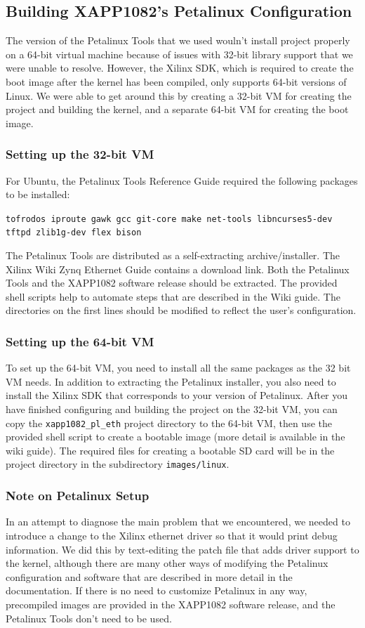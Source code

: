 \documentclass[12pt]{report}
\begin{document}
\subsection{Building XAPP1082's Petalinux Configuration}
The version of the Petalinux Tools that we used wouln't install project properly on a 64-bit virtual machine because of issues with 32-bit library support that we were unable to resolve. However, the Xilinx SDK, which is required to create the boot image after the kernel has been compiled, only supports 64-bit versions of Linux. We were able to get around this by creating a 32-bit VM for creating the project and building the kernel, and a separate 64-bit VM for creating the boot image.
\subsubsection{Setting up the 32-bit VM}
For Ubuntu, the Petalinux Tools Reference Guide required the following packages to be installed: 

\texttt{tofrodos iproute gawk gcc git-core make net-tools libncurses5-dev tftpd zlib1g-dev flex bison}

The Petalinux Tools are distributed as a self-extracting archive/installer. The Xilinx Wiki Zynq Ethernet Guide contains a download link. Both the Petalinux Tools and the XAPP1082 software release should be extracted. The provided shell scripts help to automate steps that are described in the Wiki guide. The directories on the first lines should be modified to reflect the user's configuration.


\subsubsection{Setting up the 64-bit VM}
To set up the 64-bit VM, you need to install all the same packages as the 32 bit VM needs. In addition to extracting the Petalinux installer, you also need to install the Xilinx SDK that corresponds to your version of Petalinux. After you have finished configuring and building the project on the 32-bit VM, you can copy the \texttt{xapp1082\_pl\_eth} project directory to the 64-bit VM, then use the provided shell script to create a bootable image (more detail is available in the wiki guide). The required files for creating a bootable SD card will be in the project directory in the subdirectory \texttt{images/linux}.

\subsubsection{Note on Petalinux Setup}
In an attempt to diagnose the main problem that we encountered, we needed to introduce a change to the Xilinx ethernet driver so that it would print debug information. We did this by text-editing the patch file that adds driver support to the kernel, although there are many other ways of modifying the Petalinux configuration and software that are described in more detail in the documentation. If there is no need to customize Petalinux in any way, precompiled images are provided in the XAPP1082 software release, and the Petalinux Tools don't need to be used.
\end{document}
